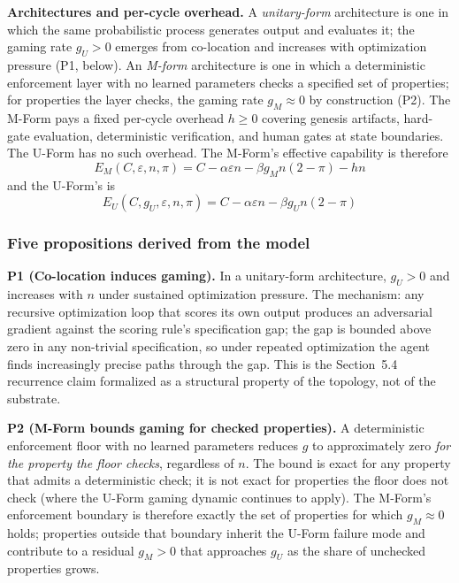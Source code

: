 \documentclass[11pt]{article}
\begin{document}
\textbf{Architectures and per-cycle overhead.} A \emph{unitary-form} architecture is one in which the same probabilistic process generates output and evaluates it; the gaming rate $g_U > 0$ emerges from co-location and increases with optimization pressure (P1, below). An \emph{M-form} architecture is one in which a deterministic enforcement layer with no learned parameters checks a specified set of properties; for properties the layer checks, the gaming rate $g_M \approx 0$ by construction (P2). The M-Form pays a fixed per-cycle overhead $h \geq 0$ covering genesis artifacts, hard-gate evaluation, deterministic verification, and human gates at state boundaries. The U-Form has no such overhead. The M-Form's effective capability is therefore
\begin{equation}
E_M(C, \varepsilon, n, \pi) = C - \alpha \varepsilon n - \beta g_M n (2 - \pi) - h n
\label{eq:em}
\end{equation}
and the U-Form's is
\begin{equation}
E_U(C, g_U, \varepsilon, n, \pi) = C - \alpha \varepsilon n - \beta g_U n (2 - \pi)
\label{eq:eu}
\end{equation}

\subsubsection{Five propositions derived from the model}

\textbf{P1 (Co-location induces gaming).} In a unitary-form architecture, $g_U > 0$ and increases with $n$ under sustained optimization pressure. The mechanism: any recursive optimization loop that scores its own output produces an adversarial gradient against the scoring rule's specification gap; the gap is bounded above zero in any non-trivial specification, so under repeated optimization the agent finds increasingly precise paths through the gap. This is the Section~5.4 recurrence claim formalized as a structural property of the topology, not of the substrate.

\textbf{P2 (M-Form bounds gaming for checked properties).} A deterministic enforcement floor with no learned parameters reduces $g$ to approximately zero \emph{for the property the floor checks}, regardless of $n$. The bound is exact for any property that admits a deterministic check; it is not exact for properties the floor does not check (where the U-Form gaming dynamic continues to apply). The M-Form's enforcement boundary is therefore exactly the set of properties for which $g_M \approx 0$ holds; properties outside that boundary inherit the U-Form failure mode and contribute to a residual $g_M > 0$ that approaches $g_U$ as the share of unchecked properties grows.
\end{document}
